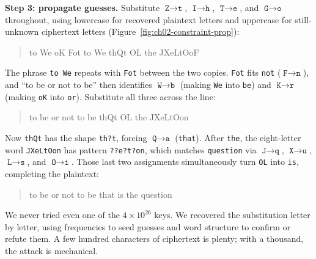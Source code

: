 \textbf{Step 3: propagate guesses.} Substitute $\texttt{Z} \to \texttt{t}$, $\texttt{I} \to
\texttt{h}$, $\texttt{T} \to \texttt{e}$, and $\texttt{G} \to \texttt{o}$ throughout, using
lowercase for recovered plaintext letters and uppercase for still-unknown ciphertext letters
(Figure~\ref{fig:ch02-constraint-prop}):
\begin{quote}\ttfamily
to We oK Fot to We thQt OL the JXeLtOoF
\end{quote}
The phrase \texttt{to We} repeats with \texttt{Fot} between the two copies. \texttt{Fot} fits
\texttt{not} ($\texttt{F} \to \texttt{n}$), and ``to be or not to be'' then identifies
$\texttt{W} \to \texttt{b}$ (making \texttt{We} into \texttt{be}) and $\texttt{K} \to
\texttt{r}$ (making \texttt{oK} into \texttt{or}). Substitute all three across the line:
\begin{quote}\ttfamily
to be or not to be thQt OL the JXeLtOon
\end{quote}
Now \texttt{thQt} has the shape \texttt{th?t}, forcing $\texttt{Q} \to \texttt{a}$
(\texttt{that}). After \texttt{the}, the eight-letter word \texttt{JXeLtOon} has pattern
\texttt{??e?t?on}, which matches \texttt{question} via $\texttt{J} \to \texttt{q}$,
$\texttt{X} \to \texttt{u}$, $\texttt{L} \to \texttt{s}$, and $\texttt{O} \to \texttt{i}$.
Those last two assignments simultaneously turn \texttt{OL} into \texttt{is}, completing the
plaintext:
\begin{quote}\ttfamily
to be or not to be that is the question
\end{quote}

We never tried even one of the $4\times10^{26}$ keys. We recovered the substitution
letter by letter, using frequencies to seed guesses and word structure to confirm or refute
them. A few hundred characters of ciphertext is plenty; with a thousand, the attack is
mechanical.

